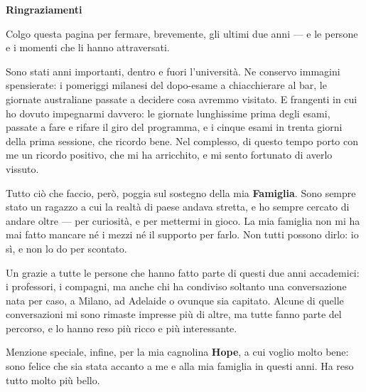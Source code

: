 \thispagestyle{empty}
\vspace*{2.5cm}
\begin{center}
  {\Large\bfseries Ringraziamenti}
\end{center}
\vspace{0.6cm}

\noindent Colgo questa pagina per fermare, brevemente, gli ultimi due anni --- e le persone
e i momenti che li hanno attraversati.

\medskip
\noindent Sono stati anni importanti, dentro e fuori l'università. Ne conservo immagini
spensierate: i pomeriggi milanesi del dopo-esame a chiacchierare al bar, le giornate
australiane passate a decidere cosa avremmo visitato. E frangenti in cui ho dovuto impegnarmi
davvero: le giornate lunghissime prima degli esami, passate a fare e rifare il giro del
programma, e i cinque esami in trenta giorni della prima sessione, che ricordo bene. Nel
complesso, di questo tempo porto con me un ricordo positivo, che mi ha arricchito, e mi sento
fortunato di averlo vissuto.

\medskip
\noindent Tutto ciò che faccio, però, poggia sul sostegno della mia \textbf{Famiglia}. Sono
sempre stato un ragazzo a cui la realtà di paese andava stretta, e ho sempre cercato di
andare oltre --- per curiosità, e per mettermi in gioco. La mia famiglia non mi ha
mai fatto mancare né i mezzi né il supporto per farlo. Non tutti possono dirlo: io sì, e
non lo do per scontato.

\medskip
\noindent Un grazie a tutte le persone che hanno fatto parte di questi due anni accademici:
i professori, i compagni, ma anche chi ha condiviso soltanto una conversazione nata per
caso, a Milano, ad Adelaide o ovunque sia capitato. Alcune di quelle conversazioni mi sono
rimaste impresse più di altre, ma tutte fanno parte del percorso, e lo hanno reso più ricco
e più interessante.

\medskip
\noindent Menzione speciale, infine, per la mia cagnolina \textbf{Hope}, a cui voglio molto
bene: sono felice che sia stata accanto a me e alla mia famiglia in questi
anni. Ha reso tutto molto più bello.
